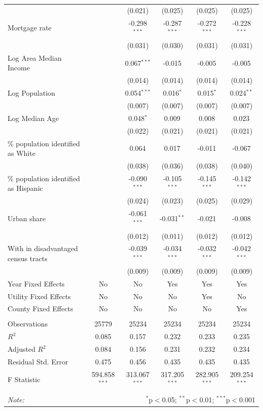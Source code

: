 \documentclass[12pt,twoside,letterpaper]{article}
\begin{document}
\begin{table}[!ht]
{\begin{tabular}{@{\extracolsep{5pt}}lccccc}
& & (0.021) & (0.025) & (0.025) & (0.025) \\
 Mortgage rate & & -0.298$^{***}$ & -0.287$^{***}$ & -0.272$^{***}$ & -0.228$^{***}$ \\
& & (0.031) & (0.030) & (0.031) & (0.031) \\
 Log Area Median Income & & 0.067$^{***}$ & -0.015$^{}$ & -0.005$^{}$ & -0.005$^{}$ \\
& & (0.014) & (0.014) & (0.014) & (0.014) \\
 Log Population & & 0.054$^{***}$ & 0.016$^{*}$ & 0.015$^{*}$ & 0.024$^{**}$ \\
& & (0.007) & (0.007) & (0.007) & (0.007) \\
 Log Median Age & & 0.048$^{*}$ & 0.009$^{}$ & 0.008$^{}$ & 0.023$^{}$ \\
& & (0.022) & (0.021) & (0.021) & (0.021) \\
 \% population identified as White & & 0.064$^{}$ & 0.017$^{}$ & -0.011$^{}$ & -0.067$^{}$ \\
& & (0.038) & (0.036) & (0.038) & (0.040) \\
 \% population identified as Hispanic & & -0.090$^{***}$ & -0.105$^{***}$ & -0.145$^{***}$ & -0.142$^{***}$ \\
& & (0.024) & (0.023) & (0.025) & (0.029) \\
 Urban share & & -0.061$^{***}$ & -0.031$^{**}$ & -0.021$^{}$ & -0.008$^{}$ \\
& & (0.012) & (0.011) & (0.012) & (0.012) \\
 With in disadvantaged census tracts & & -0.039$^{***}$ & -0.034$^{***}$ & -0.032$^{***}$ & -0.042$^{***}$ \\
& & (0.009) & (0.009) & (0.009) & (0.009) \\
 Year Fixed Effects & No & No & Yes & Yes & Yes \\
 Utility Fixed Effects & No & No & No & Yes & No \\
 County Fixed Effects & No & No & No & No & Yes \\
\hline \\[-1.8ex]
 Observations & 25779 & 25234 & 25234 & 25234 & 25234 \\
 $R^2$ & 0.085 & 0.157 & 0.232 & 0.233 & 0.235 \\
 Adjusted $R^2$ & 0.084 & 0.156 & 0.231 & 0.232 & 0.234 \\
 Residual Std. Error & 0.475 & 0.456 & 0.435 & 0.435 & 0.435 \\
 F Statistic & 594.858$^{***}$ & 313.067$^{***}$ & 317.205$^{***}$ & 282.905$^{***}$ & 209.254$^{***}$ \\
\hline
\hline \\[-1.8ex]
\textit{Note:} & \multicolumn{5}{r}{$^{*}$p$<$0.05; $^{**}$p$<$0.01; $^{***}$p$<$0.001} \\
\end{tabular}
}
\end{table}
\end{document}

